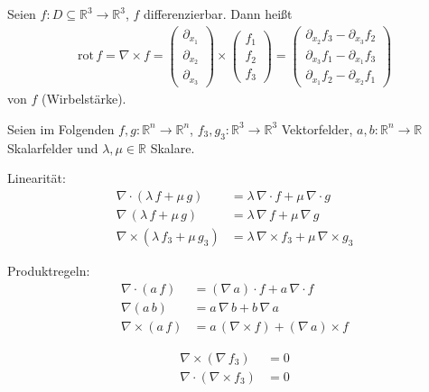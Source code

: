 \begin{theorem}[Definition]
\begin{enum-arab}
    \item Seien $f : D \subseteq \mathbb{R}^3 \to \mathbb{R}^3$, $f$ differenzierbar. Dann heißt
    \begin{align*}
      \mathrm{rot}\, f = \nabla \times f = 
      \begin{pmatrix} \partial_{x_1} \\ \partial_{x_2} \\ \partial_{x_3} \end{pmatrix}
      \times
      \begin{pmatrix} f_1 \\ f_2 \\ f_3 \end{pmatrix}
      =
      \begin{pmatrix} \partial_{x_2} f_3 - \partial_{x_3} f_2 \\ \partial_{x_3} f_1 - \partial_{x_1} f_3 \\ \partial_{x_1} f_2 - \partial_{x_2} f_1 \end{pmatrix}
    \end{align*}
     von $f$ (Wirbelstärke).
  \end{enum-arab}
\end{theorem}

\begin{notice}[Rechenregeln:]
  Seien im Folgenden $f,g : \mathbb{R}^n \to \mathbb{R}^n$, $f_3,g_3 : \mathbb{R}^3 \to \mathbb{R}^3$ Vektorfelder, $a,b : \mathbb{R}^n \to \mathbb{R}$ Skalarfelder und $\lambda, \mu \in \mathbb{R}$ Skalare.
  \begin{enum-arab}
    \item Linearität:
    \begin{align*}
      \nabla \cdot (\lambda \, f + \mu \, g) &= \lambda \, \nabla \cdot f + \mu \, \nabla \cdot g \\
      \nabla \, (\lambda \, f + \mu \, g) &= \lambda \, \nabla \, f + \mu \, \nabla \, g \\
      \nabla \times (\lambda \, f_3 + \mu \, g_3) &= \lambda \, \nabla \times f_3 + \mu \, \nabla \times g_3
    \end{align*}
    
    \item Produktregeln:
    \begin{align*}
      \nabla \cdot (a \, f) &= (\nabla \, a) \cdot f + a \, \nabla \cdot f \\
      \nabla (a \, b) &= a \, \nabla \, b + b \, \nabla \, a \\
      \nabla \times (a \, f) &= a \, (\nabla \times f) + (\nabla \, a) \times f
    \end{align*}
    
    \item
    \begin{align*}
      \nabla \times (\nabla \, f_3) &= 0 \\
      \nabla \cdot (\nabla \times f_3) &= 0
    \end{align*}
  \end{enum-arab}
\end{notice}

